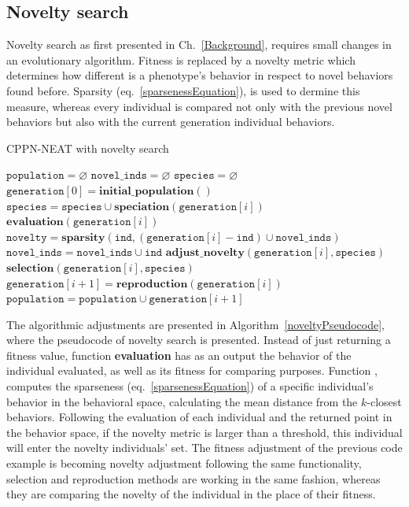 \subsection{Novelty search}
Novelty search as first presented in Ch.~\ref{Background}, requires small changes in an evolutionary algorithm. Fitness is replaced by a novelty metric which determines how different is a phenotype's behavior in respect to novel behaviors found before. Sparsity (eq.~\ref{sparsenessEquation}), is used to dermine this measure, whereas every individual is compared not only with the previous novel behaviors but also with the current generation individual behaviors. 



\begin{algorithm}[t!]
\caption{CPPN-NEAT with novelty search}
\label{noveltyPseudocode}
\begin{algorithmic}[1]
\STATE $\mathtt{population} = \varnothing$
\STATE $\mathtt{novel\_inds} = \varnothing$
\STATE $\mathtt{species} = \varnothing$
\STATE $\mathtt{generation}[0] = \mathbf{initial\_population}()$
\STATE $\mathtt{species} = \mathtt{species} \cup \mathbf{speciation}(\mathtt{generation}[i])$
\STATE $\mathbf{evaluation}(\mathtt{generation}[i])$
\STATE $\mathtt{novelty} = \mathbf{sparsity}(\mathtt{ind}, (\mathtt{generation}[i] - \mathtt{ind}) \cup \mathtt{novel\_inds})$
\STATE $\mathtt{novel\_inds} = \mathtt{novel\_inds} \cup \mathtt{ind}$
\ENDIF
\ENDFOR
\STATE $\mathbf{adjust\_novelty}(\mathtt{generation}[i], \mathtt{species})$
\STATE $\mathbf{selection}(\mathtt{generation}[i], \mathtt{species})$
\STATE $\mathtt{generation}[i+1] = \mathbf{reproduction}(\mathtt{generation}[i])$
\STATE $\mathtt{population} = \mathtt{population} \cup \mathtt{generation}[i+1]$
\ENDFOR
\end{algorithmic}
\end{algorithm}


The algorithmic adjustments are presented in Algorithm~\ref{noveltyPseudocode}, where the pseudocode of novelty search is presented. Instead of just returning a fitness value, function \textbf{evaluation} has as an output the behavior of the individual evaluated, as well as its fitness for comparing purposes. Function , computes the sparseness (eq.~\ref{sparsenessEquation}) of a specific individual's behavior in the behavioral space, calculating the mean distance from the $k$-closest behaviors. Following the evaluation of each individual and the returned point in the behavior space, if the novelty metric is larger than a threshold, this individual will enter the novelty individuals' set. The fitness adjustment of the previous code example is becoming novelty adjustment following the same functionality, selection and reproduction methods are working in the same fashion, whereas they are comparing the novelty of the individual in the place of their fitness.


